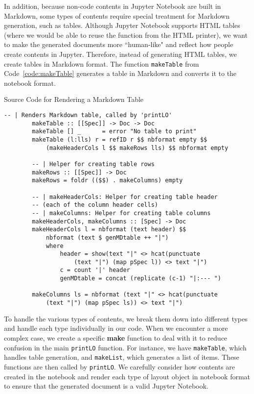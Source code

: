 In addition, because non-code contents in Jupyter Notebook are built in 
Markdown, some types of contents require special treatment for Markdown 
generation, such as tables. Although Jupyter Notebook supports HTML tables 
(where we would be able to reuse the function from the HTML printer), we want 
to make the generated documents more ``human-like" and reflect how people 
create contents in Jupyter. Therefore, instead of generating HTML tables, we 
create tables in Markdown format. The function \texttt{makeTable} from 
Code~\ref{code:makeTable} generates a table in Markdown and converts it to the
notebook format.

\begin{listing}[h!]
	\caption{Source Code for Rendering a Markdown Table}
	\label{code:makeTable}
	\begin{lstlisting}[language=haskell1]
		-- | Renders Markdown table, called by 'printLO'
		makeTable :: [[Spec]] -> Doc -> Doc
		makeTable [] _      = error "No table to print"
		makeTable (l:lls) r = refID r $$ nbformat empty $$ 
			(makeHeaderCols l $$ makeRows lls) $$ nbformat empty
		
		-- | Helper for creating table rows
		makeRows :: [[Spec]] -> Doc
		makeRows = foldr (($$) . makeColumns) empty
		
		-- | makeHeaderCols: Helper for creating table header
		-- (each of the column header cells)
		-- | makeColumns: Helper for creating table columns
		makeHeaderCols, makeColumns :: [Spec] -> Doc
		makeHeaderCols l = nbformat (text header) $$ 
			nbformat (text $ genMDtable ++ "|")
			where 
				header = show(text "|" <> hcat(punctuate 
					(text "|") (map pSpec l)) <> text "|")        
				c = count '|' header
				genMDtable = concat (replicate (c-1) "|:--- ")
		
		makeColumns ls = nbformat (text "|" <> hcat(punctuate 
			(text "|") (map pSpec ls)) <> text "|")
	\end{lstlisting}
\end{listing}

To handle the various types of contents, we break them down into different 
types and handle each type individually in our code. When we encounter a more 
complex case, we create a specific \textbf{make} function to deal with it to 
reduce confusion in the main \texttt{printLO} function. For instance, 
we have \texttt{makeTable}, which handles table generation, and 
\texttt{makeList}, which generates a list of items. These functions are then 
called by \texttt{printLO}. We carefully consider how contents are created in 
the notebook and render each type of layout object in notebook format to ensure 
that the generated document is a valid Jupyter Notebook.

